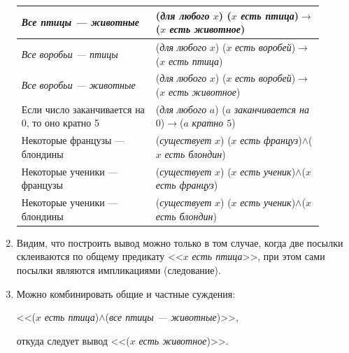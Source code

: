 \begin{enumerate}
\begin{tabular}{p{0.4\linewidth}p{0.5\linewidth}}\hline
\textit{Все птицы --- животные}  & (\textit{для любого} $x$) ($x$ \textit{есть птица})$\to$($x$ \textit{есть животное}) \\\hline
\textit{Все воробьи --- птицы}  & (\textit{для любого} $x$) ($x$ \textit{есть воробей})$\to$($x$ \textit{есть птица}) \\\hline
\textit{Все воробьи --- животные}  & (\textit{для любого} $x$) ($x$ \textit{есть воробей})$\to$($x$ \textit{есть животное}) \\\hline
Если число заканчивается на 0, то оно кратно 5 &
(\textit{для любого} $a$) ($a$ \textit{заканчивается на $0$})$\to$($a$ \textit{кратно $5$}) \\\hline
Некоторые французы --- блондины 
& (\textit{существует} $x$) ($x$ \textit{есть француз})$\land$($x$ \textit{есть блондин}) \\\hline
Некоторые ученики --- французы 
& (\textit{существует} $x$) ($x$ \textit{есть ученик})$\land$($x$ \textit{есть француз}) \\\hline
Некоторые ученики --- блондины 
& (\textit{существует} $x$) ($x$ \textit{есть ученик})$\land$($x$ \textit{есть блондин}) \\\hline
\end{tabular}

\item Видим, что построить вывод можно только в том случае, когда две посылки склеиваются по общему предикату <<$x$\textit{ есть птица}>>, при этом сами посылки являются импликациями (следование).
\item Можно комбинировать общие и частные суждения:
\begin{center}
<<($x$ \textit{есть птица})$\land$(\textit{все птицы --- животные})>>,
\end{center}
откуда следует вывод <<($x$ \textit{есть животное})>>.


\end{enumerate}
